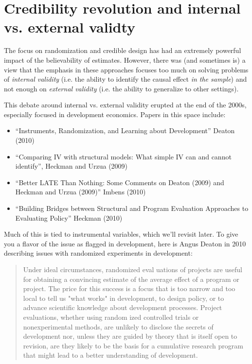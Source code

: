\documentclass{tufte-handout}
\theoremstyle{break}
\begin{document}
\section{Credibility revolution and internal vs. external validty}

The focus on randomization and credible design has had an extremely powerful impact of the believability of estimates. However, there was (and sometimes is) a view that the emphasis in these approaches focuses too much on solving problems of \emph{internal validity} (i.e. the ability to identify the causal effect \emph{in the sample}) and not enough on \emph{external validity} (i.e. the ability to generalize to other settings). 

This debate around internal vs. external validity erupted at the end of the 2000s, especially focused in development economics. Papers in this space include:
    \begin{itemize}
    \item ``Instruments, Randomization, and Learning about Development'' Deaton (2010)
    \item ``Comparing IV with structural models: What simple IV can and cannot identify'', Heckman and Urzua (2009)
    \item ``Better LATE Than Nothing: Some Comments on Deaton (2009) and Heckman and Urzua (2009)'' Imbens (2010)
    \item ``Building Bridges between Structural and Program Evaluation Approaches to Evaluating Policy'' Heckman (2010)
    \end{itemize}
Much of this is tied to instrumental variables, which we'll revisit later. To give you a flavor of the issue as flagged in development, here is Angus Deaton in 2010 \citep{deaton2010instruments} describing issues with randomized experiments in development:

\begin{quote}
  Under ideal circumstances, randomized eval
 uations of projects are useful for obtaining
 a convincing estimate of the average effect
 of a program or project. The price for this
 success is a focus that is too narrow and too
 local to tell us "what works" in development,
 to design policy, or to advance scientific knowledge about development processes. Project evaluations, whether using random ized controlled trials or nonexperimental
 methods, are unlikely to disclose the secrets
 of development nor, unless they are guided
 by theory that is itself open to revision, are
 they likely to be the basis for a cumulative
 research program that might lead to a better understanding of development.
\end{quote}
\end{document}
